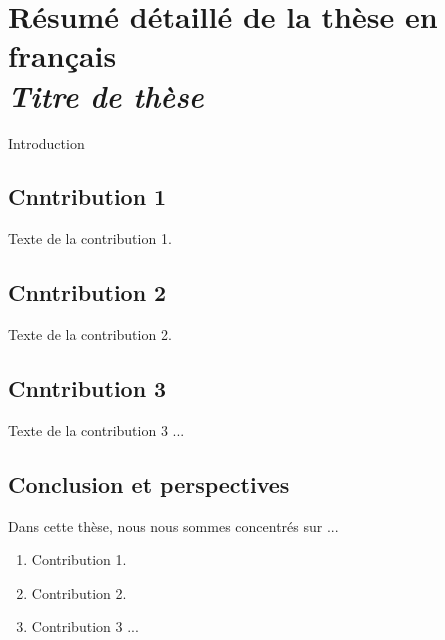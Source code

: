 \chapter*{Résumé détaillé de la thèse en français \\ $~$ \\ \Large \textit{Titre de thèse}}


Introduction

\section*{Cnntribution 1}

Texte de la contribution 1.

\section*{Cnntribution 2}

Texte de la contribution 2.

\section*{Cnntribution 3}

Texte de la contribution 3 ...

\section*{Conclusion et perspectives}

Dans cette thèse, nous nous sommes concentrés sur ...

\begin{enumerate}
	\item Contribution 1.
	
	\item Contribution 2.
	
	\item Contribution 3 ...
\end{enumerate}
